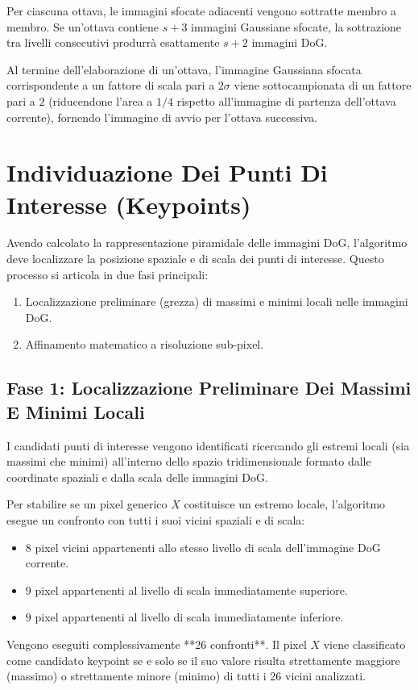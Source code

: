 ﻿\documentclass[11pt, a4paper]{article}
\begin{document}
Per ciascuna ottava, le immagini sfocate adiacenti vengono sottratte membro a membro. Se un'ottava contiene $s+3$ immagini Gaussiane sfocate, la sottrazione tra livelli consecutivi produrrà esattamente $s+2$ immagini DoG.

Al termine dell'elaborazione di un'ottava, l'immagine Gaussiana sfocata corrispondente a un fattore di scala pari a $2\sigma$ viene sottocampionata di un fattore pari a $2$ (riducendone l'area a $1/4$ rispetto all'immagine di partenza dell'ottava corrente), fornendo l'immagine di avvio per l'ottava successiva.

\newpage

\section{Individuazione Dei Punti Di Interesse (Keypoints)}

Avendo calcolato la rappresentazione piramidale delle immagini DoG, l'algoritmo deve localizzare la posizione spaziale e di scala dei punti di interesse. Questo processo si articola in due fasi principali:
\begin{enumerate}
    \item Localizzazione preliminare (grezza) di massimi e minimi locali nelle immagini DoG.
    \item Affinamento matematico a risoluzione sub-pixel.
\end{enumerate}

\subsection{Fase 1: Localizzazione Preliminare Dei Massimi E Minimi Locali}

I candidati punti di interesse vengono identificati ricercando gli estremi locali (sia massimi che minimi) all'interno dello spazio tridimensionale formato dalle coordinate spaziali e dalla scala delle immagini DoG.


Per stabilire se un pixel generico $X$ costituisce un estremo locale, l'algoritmo esegue un confronto con tutti i suoi vicini spaziali e di scala:
\begin{itemize}
    \item $8$ pixel vicini appartenenti allo stesso livello di scala dell'immagine DoG corrente.
    \item $9$ pixel appartenenti al livello di scala immediatamente superiore.
    \item $9$ pixel appartenenti al livello di scala immediatamente inferiore.
\end{itemize}
Vengono eseguiti complessivamente **26 confronti**. Il pixel $X$ viene classificato come candidato keypoint se e solo se il suo valore risulta strettamente maggiore (massimo) o strettamente minore (minimo) di tutti i 26 vicini analizzati.
\end{document}
